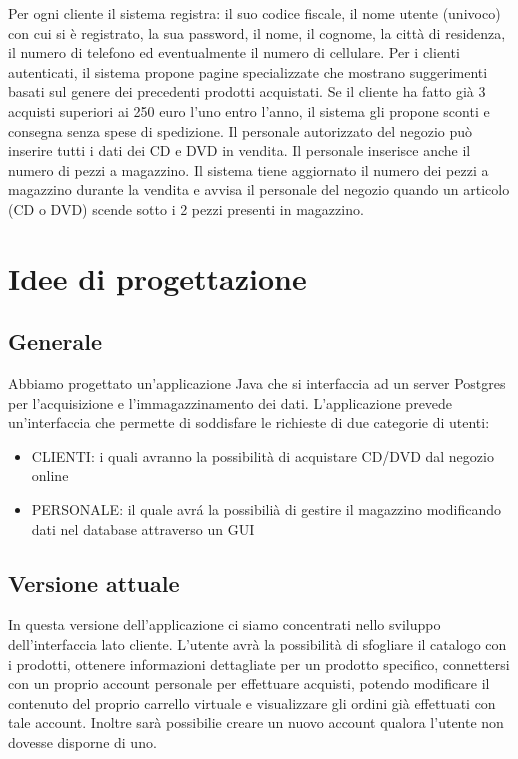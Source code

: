 \documentclass[a4paper,titlepage]{book}
\begin{document}
Per ogni cliente il sistema registra: il suo codice fiscale, il nome utente (univoco) con cui si \`e registrato,
la sua password, il nome, il cognome, la citt\`a di residenza, il numero di telefono ed eventualmente il
numero di cellulare.
Per i clienti autenticati, il sistema propone pagine specializzate che mostrano suggerimenti basati sul
genere dei precedenti prodotti acquistati.
Se il cliente ha fatto gi\`a 3 acquisti superiori ai 250 euro l’uno entro l’anno, il sistema gli propone sconti e
consegna senza spese di spedizione.
Il personale autorizzato del negozio pu\`o inserire tutti i dati dei CD e DVD in vendita. Il personale
inserisce anche il numero di pezzi a magazzino. Il sistema tiene aggiornato il numero dei pezzi a
magazzino durante la vendita e avvisa il personale del negozio quando un articolo (CD o DVD) scende
sotto i 2 pezzi presenti in magazzino.

\chapter{Idee di progettazione}
\section{Generale}
Abbiamo progettato un'applicazione Java che si interfaccia ad un server Postgres per l'acquisizione e
l'immagazzinamento dei dati. L'applicazione prevede un'interfaccia che permette di soddisfare le richieste
di due categorie di utenti:
\begin{itemize}
\item CLIENTI: i quali avranno la possibilit\`a di acquistare CD/DVD dal negozio online
\item PERSONALE: il quale avr\'a la possibili\`a di gestire il magazzino modificando dati nel database attraverso un GUI
\end{itemize}

\section{Versione attuale}
In questa versione dell'applicazione ci siamo concentrati nello sviluppo dell'interfaccia lato cliente.
L'utente avr\`a la possibilit\`a di sfogliare il catalogo con i prodotti, ottenere informazioni dettagliate per un prodotto
specifico, connettersi con un proprio account personale per effettuare acquisti, potendo modificare il contenuto 
del proprio carrello virtuale e visualizzare gli ordini gi\`a effettuati con tale account. Inoltre sar\`a possibilie creare un nuovo account qualora l'utente non dovesse disporne di uno.
\end{document}
